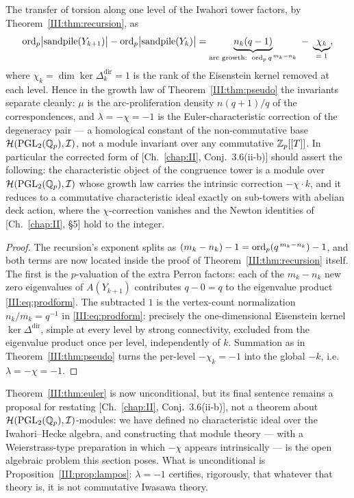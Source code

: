 \begin{theorem}\label{III:thm:euler}
The transfer of torsion along one level of the Iwahori tower factors, by
Theorem~\ref{III:thm:recursion}, as
\[
\operatorname{ord}_p\bigl|\mathrm{sandpile}(Y_{k+1})\bigr|-\operatorname{ord}_p\bigl|\mathrm{sandpile}(Y_k)\bigr|
=\underbrace{n_k(q-1)}_{\text{arc growth: }\operatorname{ord}_p q^{\,m_k-n_k}}
\;-\;\underbrace{\chi_k}_{\;=\;1\;},
\]
where $\chi_k=\dim\ker\Delta^{\mathrm{dir}}_{k}=1$ is the rank of the Eisenstein
kernel removed at each level. Hence in the growth law of Theorem~\ref{III:thm:pseudo} the
invariants separate cleanly: $\mu$ is the arc-proliferation density
$n(q+1)/q$ of the correspondences, and $\lambda=-\chi=-1$ is the Euler-characteristic
correction of the degeneracy pair --- a homological constant of the non-commutative
base $\mathcal{H}(\mathrm{PGL}_2(\mathbb{Q}_p),\mathcal{I})$, not a module invariant over any commutative
$\mathbb{Z}_p[[T]]$. In particular the corrected form of [Ch.~\ref{chap:II}, Conj.~3.6(ii-b)] should assert
the following: the characteristic object of the congruence tower is a module over
$\mathcal{H}(\mathrm{PGL}_2(\mathbb{Q}_p),\mathcal{I})$ whose growth law carries the intrinsic correction
$-\chi\cdot k$, and it reduces to a commutative characteristic ideal exactly on
sub-towers with abelian deck action, where the $\chi$-correction vanishes and the
Newton identities of [Ch.~\ref{chap:II}, \S5] hold to the integer.
\end{theorem}

\begin{proof}
The recursion's exponent splits as $(m_k-n_k)-1=\operatorname{ord}_p(q^{\,m_k-n_k})-1$, and both
terms are now located inside the proof of Theorem~\ref{III:thm:recursion} itself. The
first is the $p$-valuation of the extra Perron factors: each of the $m_k-n_k$ new
zero eigenvalues of $A(Y_{k+1})$ contributes $q-0=q$ to the eigenvalue product
\eqref{III:eq:prodform}. The subtracted $1$ is the vertex-count normalization
$n_k/m_k=q^{-1}$ in \eqref{III:eq:prodform}: precisely the one-dimensional Eisenstein
kernel $\ker\Delta^{\mathrm{dir}}$, simple at every level by strong connectivity,
excluded from the eigenvalue product once per level, independently of $k$. Summation
as in Theorem~\ref{III:thm:pseudo} turns the per-level $-\chi_k=-1$ into the global
$-k$, i.e.\ $\lambda=-\chi=-1$.
\end{proof}

\begin{remark}\label{III:rem:scope2}
Theorem~\ref{III:thm:euler} is now unconditional, but its final sentence remains a
proposal for restating
[Ch.~\ref{chap:II}, Conj.~3.6(ii-b)], not a theorem about $\mathcal{H}(\mathrm{PGL}_2(\mathbb{Q}_p),\mathcal{I})$-modules: we have
defined no characteristic ideal over the Iwahori--Hecke algebra, and constructing that
module theory --- with a Weierstrass-type preparation in which $-\chi$ appears
intrinsically --- is the open algebraic problem this section poses. What is
unconditional is Proposition~\ref{III:prop:lampos}: $\lambda=-1$ certifies, rigorously,
that whatever that theory is, it is not commutative Iwasawa theory.
\end{remark}

